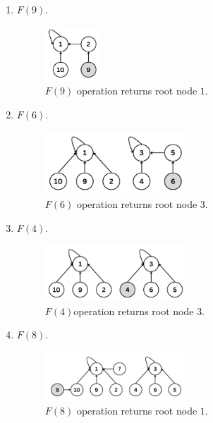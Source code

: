 \documentclass{article}
\begin{document}
\begin{enumerate}
\begin{enumerate}
    \begin{enumerate}
      \item $F(9)$.

      \begin{figure}[H]
        \centering
        \includegraphics[width=0.2\textwidth]{image5.png}
        \caption{$F(9)$ operation returns root node $1$.}
      \end{figure}

      \item $F(6)$.

      \begin{figure}[H]
        \centering
        \includegraphics[width=0.5\textwidth]{image6.png}
        \caption{$F(6)$ operation returns root node $3$.}
      \end{figure}

      \item $F(4)$.

      \begin{figure}[H]
        \centering
        \includegraphics[width=0.5\textwidth]{image7.png}
        \caption{$F(4)$operation returns root node $3$.}
      \end{figure}

      \item $F(8)$.

      \begin{figure}[H]
        \centering
        \includegraphics[width=0.5\textwidth]{image8.png}
        \caption{$F(8)$ operation returns root node $1$.}
      \end{figure}


\end{enumerate}
\end{enumerate}
\end{enumerate}
\end{document}

